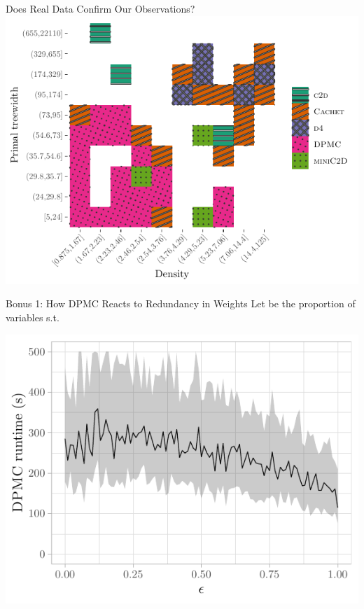 \documentclass{beamer}
\begin{document}
\begin{frame}{Does Real Data Confirm Our Observations?}
  \centering
  \includegraphics{real}
\end{frame}

\begin{frame}{Bonus 1: How \textsc{DPMC} Reacts to Redundancy in Weights}
  Let \structure{$\epsilon$} be the proportion of variables  s.t.

  \centering
  \includegraphics{epsilon}
\end{frame}
\end{document}
